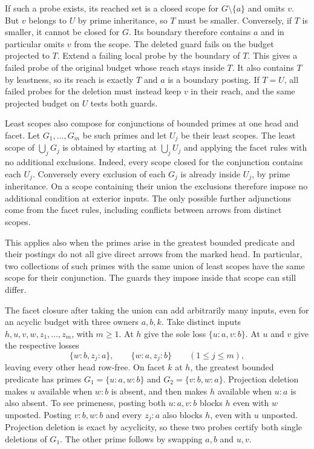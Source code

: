 If such a probe exists, its reached set
is a closed scope for $G\setminus\{a\}$ and
omits $v$. But $v$ belongs to $U$ by prime
inheritance, so $T$ must be smaller. Conversely,
if $T$ is smaller, it cannot be closed for $G$.
Its boundary therefore contains $a$ and in
particular omits $v$ from the scope. The
deleted guard fails on the budget projected
to $T$. Extend a failing local probe by the
boundary of $T$. This gives a failed probe
of the original budget whose reach stays
inside $T$. It also contains $T$ by leastness,
so its reach is exactly $T$ and $a$ is a
boundary posting.
If $T=U$, all failed probes for the deletion
must instead keep $v$ in their reach, and
the same projected budget on $U$ tests
both guards.

Least scopes also compose for conjunctions of
bounded primes at one head and facet. Let
$G_1,\ldots,G_m$ be such primes and let $U_j$
be their least scopes. The least scope of
$\bigcup_j G_j$ is obtained by starting at
$\bigcup_j U_j$ and applying the facet rules
with no additional exclusions. Indeed, every
scope closed for the conjunction contains
each $U_j$. Conversely every exclusion of
each $G_j$ is already inside $U_j$, by
prime inheritance. On a scope containing
their union the exclusions therefore impose
no additional condition at exterior inputs.
The only possible further adjunctions come
from the facet rules, including conflicts
between arrows from distinct scopes.

This applies also when the primes arise in
the greatest bounded predicate and their
postings do not all give direct arrows from
the marked head. In particular, two
collections of such primes with the same
union of least scopes have the same scope
for their conjunction. The guards they
impose inside that scope can still differ.

The facet closure after taking the union can add
arbitrarily many inputs, even for an acyclic
budget with three owners $a,b,k$. Take distinct
inputs $h,u,v,w,z_1,\ldots,z_m$, with $m\ge1$.
At $h$ give the sole loss $\{u:a,v:b\}$. At
$u$ and $v$ give the respective losses
\[
 \{w:b,z_j:a\},\qquad \{w:a,z_j:b\}
 \qquad (1\le j\le m),
\]
leaving every other head row-free. On facet
$k$ at $h$, the greatest bounded predicate has
primes $G_1=\{u:a,w:b\}$ and
$G_2=\{v:b,w:a\}$. Projection deletion makes
$u$ available when $w:b$ is absent, and then
makes $h$ available when $u:a$ is also absent.
To see primeness, posting both $u:a,v:b$
blocks $h$ even with $w$ unposted. Posting
$v:b,w:b$ and every $z_j:a$ also blocks $h$,
even with $u$ unposted. Projection deletion
is exact by acyclicity, so these two probes
certify both single deletions of $G_1$.
The other prime follows by swapping $a,b$
and $u,v$.

